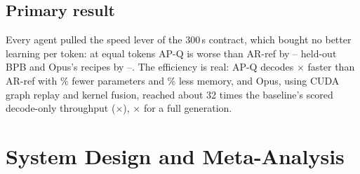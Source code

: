 \documentclass{article}
\newif\ifshowhumanmarkers \showhumanmarkersfalse
\newcommand{\humantag}[1]{{\color{humanframe}\sffamily\scriptsize\bfseries HUMAN AUTHOR MUST REWRITE/VERIFY [#1]}\ }
\newcommand{\humanauthor}[2][]{\ifshowhumanmarkers\begin{humanbox}\humantag{#1}#2\end{humanbox}\else #2\par\fi}
\begin{document}
\subsection{Primary result}
 Every agent pulled the speed lever of the 300\,s contract, which bought no better learning per token: at equal tokens AP-Q is worse than AR-ref by \CREOneMatchedLoAbs--\CREOneMatchedHiAbs{} held-out BPB and Opus's recipes by \CRMTDLoAbs--\CRMTDHiAbs. The efficiency is real: AP-Q decodes \CRDecodeRatio$\times$ faster than AR-ref with \CRParamReduction\% fewer parameters and \CRMemoryReduction\% less memory, and Opus, using CUDA graph replay and kernel fusion, reached about 32 times the baseline's scored decode-only throughput (\CROpDecodeHi$\times$), \CROpEtoEHi$\times$ for a full generation.
\label{partoneend}

\clearpage
\section{System Design and Meta-Analysis}\label{parttwo}
\end{document}
